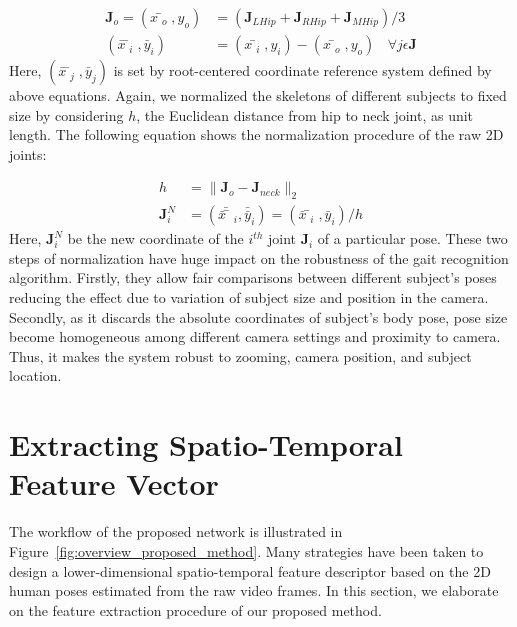 \begin{equation} 
\begin{split}
\mathbf{J}_{o} = {(x̄_{o} , y_{o})} &= {(\mathbf{J}_{LHip} +\mathbf{J}_{RHip} +\mathbf{J}_{MHip})} / {3} \\
(\bar{x}̄_{i} , \bar{y}_{i}) & = {(x̄_{i} , y_{i})} - {(x̄_{o} , y_{o})}~~~~\forall j \epsilon \mathbf{J}
\end{split}
\end{equation}
Here, $(\bar{x}̄_{j} , \bar{y}_{j})$ is set by root-centered coordinate reference system defined by above equations. Again, we normalized the skeletons of different subjects to fixed size by considering $ h $, the Euclidean distance from hip to neck joint, as unit length. The following equation shows the normalization procedure of the raw 2D joints:


\begin{equation} \label{equ:normalization_raw_joint}
\begin{split}
h &= \parallel \mathbf{J}_{o} - \mathbf{J}_{neck} \parallel_2  \\
\mathbf{J}_{i}^{N} &= (\bar{\bar{x}̄}_{i} , \bar{\bar{y}}_{i}) = (\bar{x}̄_{i} , \bar{y}_{i}) / h 
\end{split}
\end{equation}
Here, $\mathbf{J}_{i}^N$ be the new coordinate of the $i^{th}$ joint $\mathbf{J}_{i}$ of a particular pose. These two steps of normalization have huge impact on the robustness of the gait recognition algorithm. Firstly, they allow fair comparisons between different subject's poses reducing the effect due to variation of subject size and position in the camera. Secondly, as it discards the absolute coordinates of subject's body pose, pose size become homogeneous among different camera settings and proximity to camera. Thus, it makes the system robust to zooming, camera position, and subject location. 




\section{Extracting Spatio-Temporal Feature Vector} \label{sec:extract_feature_vector}
The workflow of the proposed network is illustrated in Figure~\ref{fig:overview_proposed_method}. Many strategies have been taken to design a lower-dimensional spatio-temporal feature descriptor based on the 2D human poses estimated from the raw video frames. In this section, we elaborate on the feature extraction procedure of our proposed method. 

